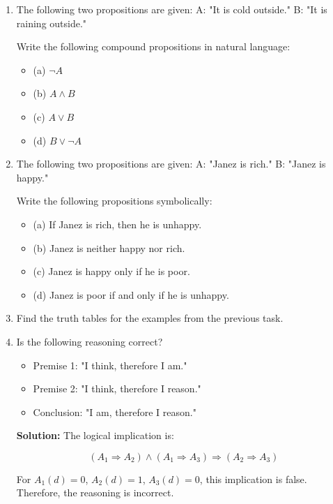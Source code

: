 \documentclass[11pt,paper=b5,footinclude,headinclude]{scrbook} %
\theoremstyle{remark}
\theoremstyle{definition} %
\theoremstyle{theorem} %
\begin{document}
\begin{enumerate}[label=\textbf{Problem \arabic*.}]
    \item 
The following two propositions are given:
A: "It is cold outside."
B: "It is raining outside."

Write the following compound propositions in natural language:
\begin{itemize}
    \item (a) $\neg A$
    \item (b) $A \land B$
    \item (c) $A \lor B$
    \item (d) $B \lor \neg A$
\end{itemize}

\item 
The following two propositions are given:
A: "Janez is rich."
B: "Janez is happy."

Write the following propositions symbolically:
\begin{itemize}
    \item (a) If Janez is rich, then he is unhappy.
    \item (b) Janez is neither happy nor rich.
    \item (c) Janez is happy only if he is poor.
    \item (d) Janez is poor if and only if he is unhappy.
\end{itemize}

\item 
Find the truth tables for the examples from the previous task.


\item
Is the following reasoning correct?

\begin{itemize}
    \item Premise 1: "I think, therefore I am."
    \item Premise 2: "I think, therefore I reason."
    \item Conclusion: "I am, therefore I reason."
\end{itemize}

\textbf{Solution:} The logical implication is:

\[
(A_1 \Rightarrow A_2) \land (A_1 \Rightarrow A_3) \Rightarrow (A_2 \Rightarrow A_3)
\]

For \( A_1(d) = 0 \), \( A_2(d) = 1 \), \( A_3(d) = 0 \), this implication is false. Therefore, the reasoning is incorrect.




\end{enumerate}
\end{document}
